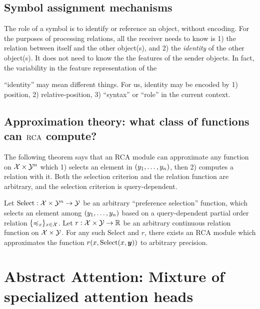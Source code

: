 \documentclass{article}
\begin{document}
\subsection{Symbol assignment mechanisms}
The role of a symbol is to identify or reference an object, without encoding. For the purposes of processing relations, all the receiver needs to know is 1) the relation between itself and the other object(s), and 2) the \textit{identity} of the other object(s). It does not need to know the the features of the sender objects. In fact, the variability in the feature representation of the 

``identity'' may mean different things. For us, identity may be encoded by 1) position, 2) relative-position, 3) ``syntax'' or ``role'' in the current context.

\subsection{Approximation theory: what class of functions can $\mathrm{RCA}$ compute?}

The following theorem says that an RCA module can approximate any function on ${\mathcal{X}} \times {\mathcal{Y}}^n$ which 1) selects an element in $(y_1, \ldots, y_n)$, then 2) computes a relation with it. Both the selection criterion and the relation function are arbitrary, and the selection criterion is query-dependent.
\begin{theorem}[Informal]
  Let $\mathrm{Select}: {\mathcal{X}} \times {\mathcal{Y}}^n \to {\mathcal{Y}}$ be an arbitrary ``preference selection'' function, which selects an element among $(y_1, \ldots, y_n)$ based on a query-dependent partial order relation $\{\preccurlyeq_x\}_{x \in {\mathcal{X}}}$. Let $r: {\mathcal{X}} \times {\mathcal{Y}} \to \mathbb{R}$ be an arbitrary continuous relation function on ${\mathcal{X}} \times {\mathcal{Y}}$. For any such $\mathrm{Select}$ and $r$, there exists an RCA module which approximates the function $r(x, \mathrm{Select}(x, \bm{y}))$ to arbitrary precision.
\end{theorem}

\section{Abstract Attention: Mixture of specialized attention heads}
\end{document}
